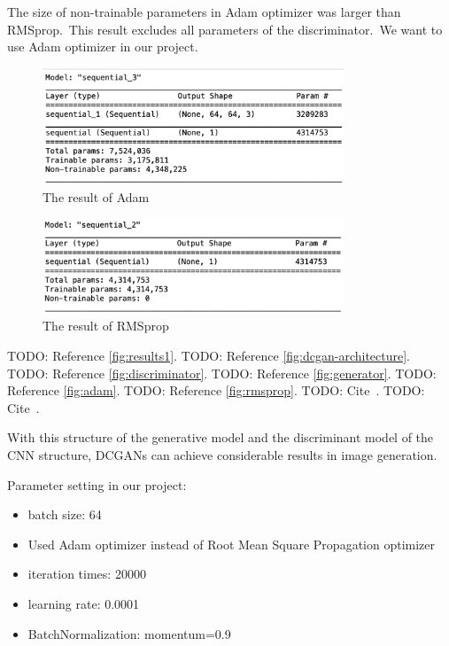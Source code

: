 \documentclass[conference]{IEEEtran}
\begin{document}
    The size of non-trainable parameters in Adam optimizer was larger than RMSprop.\ This result excludes all parameters of the discriminator.\ We want to use Adam optimizer in our project.

    \begin{figure}
        \caption{The result of Adam}
        \label{fig:adam}
        \includegraphics[width=9cm]{Adam.png}
    \end{figure}

    \begin{figure}
        \caption{The result of RMSprop}
        \label{fig:rmsprop}
        \includegraphics[width=9cm]{RMSprop.png}
    \end{figure}

    TODO: Reference \autoref{fig:results1}.
    TODO: Reference \autoref{fig:dcgan-architecture}.
    TODO: Reference \autoref{fig:discriminator}.
    TODO: Reference \autoref{fig:generator}.
    TODO: Reference \autoref{fig:adam}.
    TODO: Reference \autoref{fig:rmsprop}.
    TODO: Cite~\cite{e-in-style}.
    TODO: Cite~\cite{pytorch-generative-model-collections}.

    With this structure of the generative model and the discriminant model of the CNN structure, DCGANs can achieve considerable results in image generation.

    Parameter setting in our project:

    \begin{itemize}
        \item batch size: 64
        \item Used Adam optimizer instead of Root Mean Square Propagation optimizer
        \item iteration times: 20000
        \item learning rate: 0.0001
        \item BatchNormalization: momentum=0.9
    \end{itemize}
\end{document}
